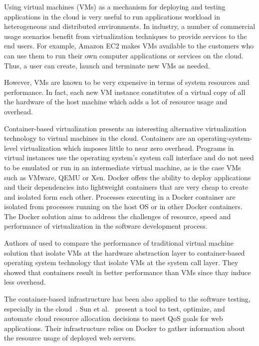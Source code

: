 Using virtual machines (VMs) as a mechanism for deploying and testing applications in the cloud is very useful to run applications workload in heterogeneous and distributed environments.
In industry, a number of commercial usage scenarios benefit from virtualization techniques to provide services to the end users. For example, Amazon EC2 makes VMs available to the customers who can use them to run their own computer applications or services on the cloud. Thus, a user can create, launch and terminate new VMs as needed.  

However, VMs are known to be very expensive in terms of system resources and performance. In fact, each new VM instance constitutes of a virtual copy of all the hardware of the host machine which adds a lot of resource usage and overhead\cite{merkel2014docker}. 

Container-based virtualization presents an interesting alternative virtualization technology to virtual machines in the cloud. Containers are an operating-system-level virtualization which imposes little to near zero overhead. Programs in virtual instances use the operating system's system call interface and do not need to be emulated or run in an intermediate virtual machine, as is the case VMs such as VMware, QEMU or Xen.
Docker offers the ability to deploy applications and their dependencies into lightweight containers that are very cheap to create and isolated form each other. Processes executing in a Docker container are isolated from processes running on the host OS or in other Docker containers. The Docker solution aims to address the challenges of resource, speed and performance of virtualization in the software development process. 

Authors of \cite{spoiala2016performance,soltesz2007container,merkel2014docker,felter2015updated} used to compare the performance of traditional virtual machine solution that isolate VMs at the hardware abstraction layer to container-based operating system technology that isolate VMs at the system call layer. They showed that containers result in better performance than VMs since thay induce less overhead. 


The container-based infrastructure has been also applied to the software testing, especially in the cloud~\cite{li2015rest}. Sun et al.~\cite{sun2016roar} present a tool to test, optimize, and automate cloud resource allocation decisions to meet QoS goals for web applications. Their infrastructure relies on Docker to gather information about the resource usage of deployed web servers. 

